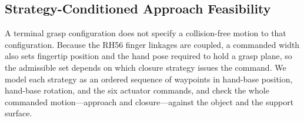%
%     
%
%
%

\subsection{Strategy-Conditioned Approach Feasibility}
\label{sec:nogo_analysis_v2}

A terminal grasp configuration does not specify a collision-free motion to that
configuration. Because the RH56 finger linkages are coupled, a commanded width
also sets fingertip position and the hand pose required to hold a grasp plane, so
the admissible set depends on which closure strategy issues the command. We
model each strategy as an ordered sequence of waypoints in hand-base position,
hand-base rotation, and the six actuator commands, and check the whole commanded
motion---approach and closure---against the object and the support surface.


